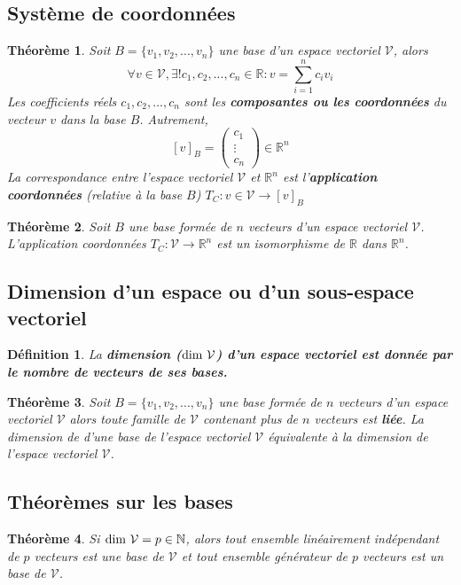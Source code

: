 \documentclass{article}[french, babel]
\newtheorem{mydef}{Définition}
\newtheorem{mythm}{Théorème}
\begin{document}
	\subsection{Système de coordonnées}
		\begin{mythm}
			Soit $B=\{v_1,v_2,...,v_n\}$ une base d'un espace vectoriel $\mathcal{V}$, alors
			\[\forall v\in\mathcal{V},\exists!c_1,c_2,...,c_n\in\mathbb{R} : v = \sum_{i=1}^{n}c_iv_i\]
			Les coefficients réels $c_1,c_2,...,c_n$ sont les \textbf{composantes ou les coordonnées} du vecteur $v$ dans la base $B$. Autrement,\[[v]_B=\begin{pmatrix}
			c_1\\ \vdots \\ c_n
			\end{pmatrix}\in\mathbb{R}^n\]
			La correspondance entre l'espace vectoriel $\mathcal{V}$ et $\mathbb{R}^n$ est l'\textbf{application coordonnées} (relative à la base $B$) $T_C : v\in\mathcal{V}\longrightarrow [v]_B$
		\end{mythm}
		\begin{mythm}
			Soit $B$ une base formée de $n$ vecteurs d'un espace vectoriel $\mathcal{V}$. L'application coordonnées $T_C : \mathcal{V}\longrightarrow\mathbb{R}^n$ est un isomorphisme de $\mathbb{R}$ dans $\mathbb{R}^n$.
		\end{mythm}
	\subsection{Dimension d'un espace ou d'un sous-espace vectoriel}
		\begin{mydef}
			La \textbf{dimension ($\text{\normalfont{dim}}\ \mathcal{V}$) d'un espace vectoriel est donnée par le nombre de vecteurs de ses bases.}
		\end{mydef}
		\begin{mythm}
			Soit $B=\{v_1,v_2,...,v_n\}$ une base formée de $n$ vecteurs d'un espace vectoriel $\mathcal{V}$ alors toute famille de $\mathcal{V}$ contenant plus de $n$ vecteurs est \textbf{liée}. La dimension de d'une base de l'espace vectoriel $\mathcal{V}$ équivalente à la dimension de l'espace vectoriel $\mathcal{V}$.
		\end{mythm}
	\subsection{Théorèmes sur les bases}
		\begin{mythm}
			Si $\text{\normalfont{dim}}\ \mathcal{V} = p\in\mathbb{N}$, alors tout ensemble linéairement indépendant de $p$ vecteurs est une base de $\mathcal{V}$ et tout ensemble générateur de $p$ vecteurs est un base de $\mathcal{V}$.
		\end{mythm}
\end{document}
